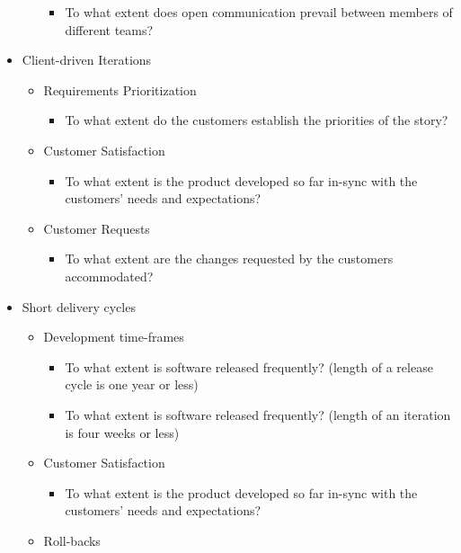 \begin{appendices}
\begin{itemize}
\begin{itemize}
\begin{itemize}
					\item To what extent does open communication prevail between members of different teams?
				\end{itemize}
		\end{itemize}
	\item Client-driven Iterations
		\begin{itemize}
			\item Requirements Prioritization
				\begin{itemize}
					\item To what extent do the customers establish the priorities of the story?
				\end{itemize}
			\item Customer Satisfaction
				\begin{itemize}
					\item To what extent is the product developed so far in-sync with the customers' needs and expectations?
				\end{itemize}
			\item Customer Requests
				\begin{itemize}
					\item To what extent are the changes requested by the customers accommodated?
				\end{itemize}			
		\end{itemize}
	\item Short delivery cycles
		\begin{itemize}
			\item Development time-frames
				\begin{itemize}
					\item To what extent is software released frequently? (length of a release cycle is one year or less)
					\item To what extent is software released frequently? (length of an iteration is four weeks or less)
				\end{itemize}
			\item Customer Satisfaction
				\begin{itemize}
					\item To what extent is the product developed so far in-sync with the customers' needs and expectations?
				\end{itemize}
			\item Roll-backs
				\begin{itemize}

\end{itemize}
\end{itemize}
\end{itemize}
\end{appendices}
